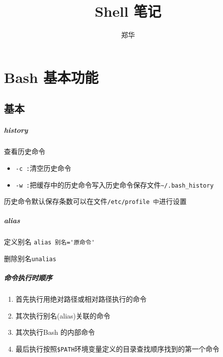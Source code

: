 \documentclass[UTF8,a4paper,12pt]{ctexbook}
\author{\kaishu 郑华}
\title{Shell 笔记}
\begin{document}
 	\maketitle
 	\tableofcontents

\chapter{Bash 基本功能}
	\section{基本}
		\paragraph{history}查看历史命令
			\begin{itemize}
				\item \verb|-c :|清空历史命令
				\item \verb|-w :|把缓存中的历史命令写入历史命令保存文件\verb|~/.bash_history|
			\end{itemize}
			
			历史命令默认保存条数可以在文件\verb|/etc/profile 中|进行设置
			
		\paragraph{alias}定义别名 \verb|alias 别名='原命令'|
		
			删除别名\verb|unalias|
		
		\paragraph{命令执行时顺序}
			\begin{enumerate}
				\item 首先执行用绝对路径或相对路径执行的命令
				\item 其次执行别名(alias)关联的命令
				\item 其次执行Bash 的内部命令
				\item 最后执行按照\verb|$PATH|环境变量定义的目录查找顺序找到的第一个命令
			\end{enumerate}
		
\end{document}
